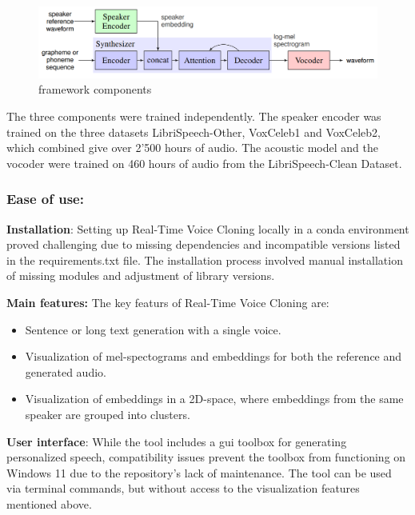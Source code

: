 \begin{figure}[h!]
    \centering
    \includegraphics[width=1\linewidth]{assets/realtime voice cloning inference.png}
    \caption{framework components \cite{jia2018transfer}}
    \label{fig:rtvc_framework}
\end{figure}

The three components were trained independently. The speaker encoder was trained on the three datasets LibriSpeech-Other, VoxCeleb1 and VoxCeleb2, which combined give over 2'500 hours of audio. The acoustic model and the vocoder were trained on 460 hours of audio from the LibriSpeech-Clean Dataset.

\subsubsection{Ease of use:}

\textbf{Installation}: Setting up Real-Time Voice Cloning locally in a conda environment proved challenging due to missing dependencies and incompatible versions listed in the requirements.txt file. The installation process involved manual installation of missing modules and adjustment of library versions.

\textbf{Main features:}
The key featurs of Real-Time Voice Cloning are:

\begin{itemize}
    \item Sentence or long text generation with a single voice.
    \item Visualization of mel-spectograms and embeddings for both the reference and generated audio.
    \item Visualization of embeddings in a 2D-space, where embeddings from the same speaker are grouped into clusters.
\end{itemize}

\textbf{User interface}: While the tool includes a \gls{gui} toolbox for generating personalized speech, compatibility issues prevent the toolbox from functioning on Windows 11 due to the repository's lack of maintenance. The tool can be used via terminal commands, but without access to the visualization features mentioned above.

